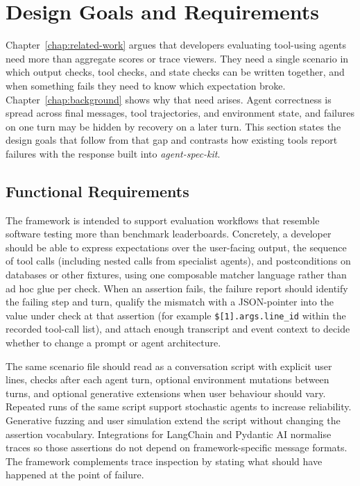 \section{Design Goals and Requirements}
\label{sec:design-goals}

Chapter~\ref{chap:related-work} argues that developers evaluating tool-using agents need more than aggregate scores or trace viewers. They need a single scenario in which output checks, tool checks, and state checks can be written together, and when something fails they need to know which expectation broke. Chapter~\ref{chap:background} shows why that need arises. Agent correctness is spread across final messages, tool trajectories, and environment state, and failures on one turn may be hidden by recovery on a later turn. This section states the design goals that follow from that gap and contrasts how existing tools report failures with the response built into \emph{agent-spec-kit}.

\subsection{Functional Requirements}

The framework is intended to support evaluation workflows that resemble software testing more than benchmark leaderboards. Concretely, a developer should be able to express expectations over the user-facing output, the sequence of tool calls (including nested calls from specialist agents), and postconditions on databases or other fixtures, using one composable matcher language rather than ad hoc glue per check. When an assertion fails, the failure report should identify the failing step and turn, qualify the mismatch with a JSON-pointer into the value under check at that assertion (for example \texttt{\$[1].args.line\_id} within the recorded tool-call list), and attach enough transcript and event context to decide whether to change a prompt or agent architecture.

The same scenario file should read as a conversation script with explicit user lines, checks after each agent turn, optional environment mutations between turns, and optional generative extensions when user behaviour should vary. Repeated runs of the same script support stochastic agents to increase reliability. Generative fuzzing and user simulation extend the script without changing the assertion vocabulary. Integrations for LangChain and Pydantic AI normalise traces so those assertions do not depend on framework-specific message formats. The framework complements trace inspection by stating what should have happened at the point of failure.


